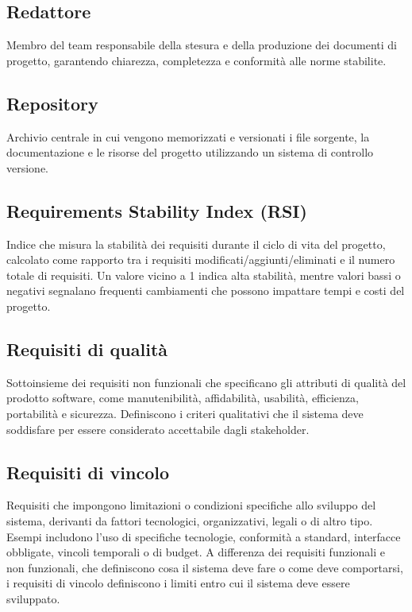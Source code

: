 \documentclass[a4paper,11pt]{article}
\begin{document}
\subsection{Redattore}
Membro del team responsabile della stesura e della produzione dei documenti di progetto, garantendo chiarezza, completezza e conformità alle norme stabilite.









\subsection{Repository}
Archivio centrale in cui vengono memorizzati e versionati i file sorgente, la documentazione e le risorse del progetto utilizzando un sistema di controllo versione.









\subsection{Requirements Stability Index (RSI)}
Indice che misura la stabilità dei requisiti durante il ciclo di vita del progetto, calcolato come rapporto tra i requisiti modificati/aggiunti/eliminati e il numero totale di requisiti. Un valore vicino a 1 indica alta stabilità, mentre valori bassi o negativi segnalano frequenti cambiamenti che possono impattare tempi e costi del progetto.







\subsection{Requisiti di qualità}
Sottoinsieme dei requisiti non funzionali che specificano gli attributi di qualità del prodotto software, come manutenibilità, affidabilità, usabilità, efficienza, portabilità e sicurezza. Definiscono i criteri qualitativi che il sistema deve soddisfare per essere considerato accettabile dagli stakeholder.







\subsection{Requisiti di vincolo}
Requisiti che impongono limitazioni o condizioni specifiche allo sviluppo del sistema, derivanti da fattori tecnologici, organizzativi, legali o di altro tipo. Esempi includono l'uso di specifiche tecnologie, conformità a standard, interfacce obbligate, vincoli temporali o di budget. A differenza dei requisiti funzionali e non funzionali, che definiscono cosa il sistema deve fare o come deve comportarsi, i requisiti di vincolo definiscono i limiti entro cui il sistema deve essere sviluppato.
\end{document}
